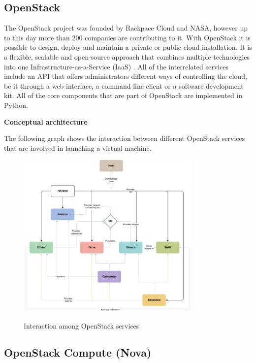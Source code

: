 \subsection{OpenStack}

The OpenStack project was founded by Rackpace Cloud and NASA, however up to this day  more than 200 companies are contributing to it.
With OpenStack it is possible to design, deploy and maintain a private or public cloud installation. It is a flexible, scalable and open-source approach that combines multiple technologies into one Infrastructure-as-a-Service (IaaS) \cite{openstack-ops}. All of the interrelated services include an API that offers administrators different ways of controlling the cloud, be it through a web-interface, a command-line client or a software development kit. All of the core components that are part of OpenStack are implemented in Python.


\textbf{Conceptual architecture}

The following graph shows the interaction between different OpenStack services that are involved in launching a virtual machine.

\begin{figure}[H]
\centering
\includegraphics[width=0.8\textwidth]{images/fundamentals/openstack_conceptual_arch.png}
\caption{Interaction among OpenStack services}\cite{openstack-installjuno}
\end{figure}


\subsection{OpenStack Compute (Nova)}

